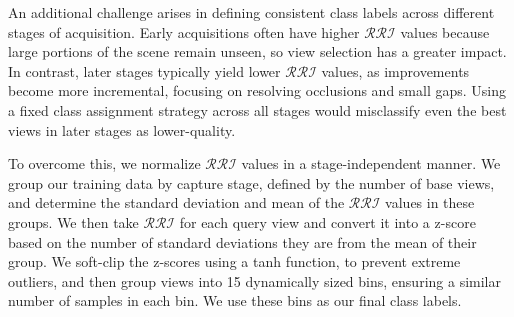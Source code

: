 An additional challenge arises in defining consistent class labels across different stages of acquisition. Early acquisitions often have higher $\mathcal{RRI}$ values because large portions of the scene remain unseen, so view selection has a greater impact. In contrast, later stages typically yield lower $\mathcal{RRI}$ values, as improvements become more incremental, focusing on resolving occlusions and small gaps. Using a fixed class assignment strategy across all stages would misclassify even the best views in later stages as lower-quality.

To overcome this, we normalize $\mathcal{RRI}$ values in a stage-independent manner. We group our training data by capture stage, defined by the number of base views, and determine the standard deviation and mean of the $\mathcal{RRI}$ values in these groups. We then take $\mathcal{RRI}$ for each query view and convert it into a z-score based on the number of standard deviations they are from the mean of their group. We soft-clip the z-scores using a tanh function, to prevent extreme outliers, and then group views into 15 dynamically sized bins, ensuring a similar number of samples in each bin. We use these bins as our final class labels.